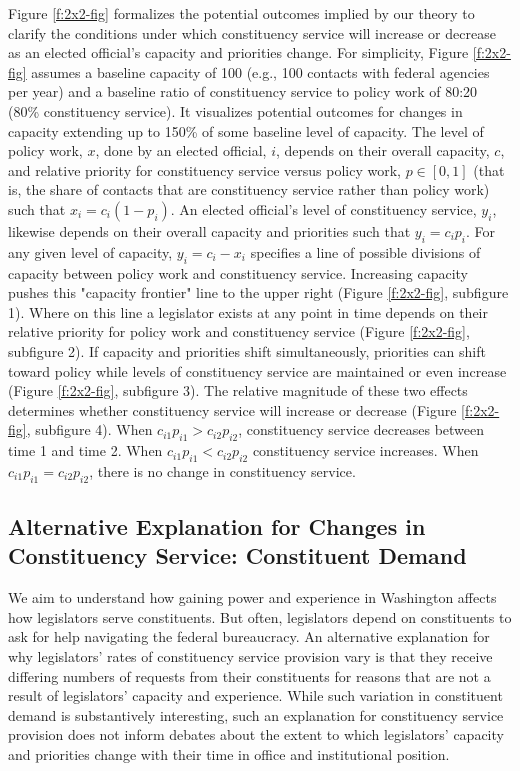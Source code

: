 \documentclass[12pt]{article}
\begin{document}
Figure \ref{f:2x2-fig} formalizes the potential outcomes implied by our theory to clarify the conditions under which constituency service will increase or decrease as an elected official's capacity and priorities change. 
For simplicity, Figure \ref{f:2x2-fig} assumes a baseline capacity of 100 (e.g., 100 contacts with federal agencies per year) and a baseline ratio of constituency service to policy work of 80:20 (80\% constituency service). It visualizes potential outcomes for changes in capacity extending up to 150\% of some baseline level of capacity.
The level of policy work, $x$, done by an elected official, $i$, depends on their overall capacity, $c$, and relative priority for constituency service versus policy work, $p \in [0, 1]$ (that is, the share of contacts that are constituency service rather than policy work) such that $x_i = c_i (1-p_i)$.
An elected official's level of constituency service, $y_i$, likewise depends on their overall capacity and priorities such that $y_i = c_i p_i$.
For any given level of capacity, $y_i = c_i-x_i$ specifies a line of possible divisions of capacity between policy work and constituency service. Increasing capacity pushes this "capacity frontier" line to the upper right (Figure \ref{f:2x2-fig}, subfigure 1). Where on this line a legislator exists at any point in time depends on their relative priority for policy work and constituency service (Figure \ref{f:2x2-fig}, subfigure 2). If capacity and priorities shift simultaneously, priorities can shift toward policy while levels of constituency service are maintained or even increase (Figure \ref{f:2x2-fig}, subfigure 3). The relative magnitude of these two effects determines whether constituency service will increase or decrease (Figure \ref{f:2x2-fig}, subfigure 4).  
When $c_{i1}p_{i1} > c_{i2}p_{i2}$, constituency service decreases between time 1 and time 2. 
When $c_{i1}p_{i1} < c_{i2}p_{i2}$ constituency service increases. 
When $c_{i1}p_{i1} = c_{i2}p_{i2}$, there is no change in constituency service. 

\subsection{Alternative Explanation for Changes in Constituency Service: Constituent Demand}

We aim to understand how gaining power and experience in Washington affects how legislators serve constituents. But often, legislators depend on constituents to ask for help navigating the federal bureaucracy. An alternative explanation for why legislators' rates of constituency service provision vary is that they receive differing numbers of requests from their constituents for reasons that are not a result of legislators' capacity and experience. While such variation in constituent demand is substantively interesting, such an explanation for constituency service provision does not inform debates about the extent to which legislators' capacity and priorities change with their time in office and institutional position. 
\end{document}
